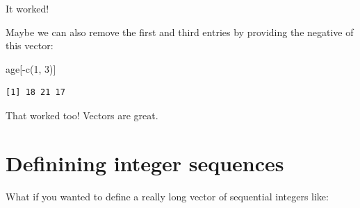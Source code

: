 \documentclass[
  letterpaper,
  DIV=11,
  numbers=noendperiod]{scrreprt}
\newenvironment{Shaded}{\begin{snugshade}}{\end{snugshade}}
\newcommand{\DecValTok}[1]{\textcolor[rgb]{0.68,0.00,0.00}{#1}}
\newcommand{\FunctionTok}[1]{\textcolor[rgb]{0.28,0.35,0.67}{#1}}
\newcommand{\NormalTok}[1]{\textcolor[rgb]{0.00,0.23,0.31}{#1}}
\newcommand{\SpecialCharTok}[1]{\textcolor[rgb]{0.37,0.37,0.37}{#1}}
\begin{document}
It worked!

Maybe we can also remove the first and third entries by providing the
negative of this vector:

\begin{Shaded}
\begin{Highlighting}[]
\NormalTok{age[}\SpecialCharTok{{-}}\FunctionTok{c}\NormalTok{(}\DecValTok{1}\NormalTok{, }\DecValTok{3}\NormalTok{)]}
\end{Highlighting}
\end{Shaded}

\begin{verbatim}
[1] 18 21 17
\end{verbatim}

That worked too! Vectors are great.

\section{Definining integer
sequences}\label{definining-integer-sequences}

What if you wanted to define a really long vector of sequential integers
like:
\end{document}
